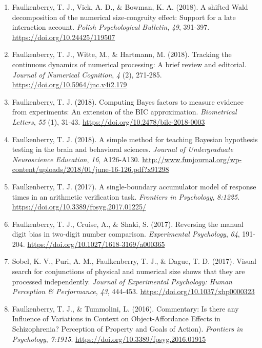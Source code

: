 \documentclass[article,10pt]{article}
\begin{document}
\begin{enumerate}
\item Faulkenberry, T. J., Vick, A. D., \& Bowman, K. A. (2018). A shifted Wald decomposition of the numerical size-congruity effect: Support for a late interaction account. \emph{Polish Psychological Bulletin}, \emph{49}, 391-397. \url{https://doi.org/}\href{http://dx.doi.org/10.24425/119507}{10.24425/119507}
\item Faulkenberry, T. J., Witte, M., \& Hartmann, M. (2018). Tracking the continuous dynamics of numerical processing: A brief review and editorial. \emph{Journal of Numerical Cognition}, \emph{4} (2), 271-285. \url{https://doi.org/}\href{http://dx.doi.org/10.5964/jnc.v4i2.179}{10.5964/jnc.v4i2.179}
\item Faulkenberry, T. J. (2018). Computing Bayes factors to measure evidence from experiments: An extension of the BIC approximation. \emph{Biometrical Letters}, \emph{55} (1), 31-43. \url{https://doi.org/}\href{https://doi.org/10.2478/bile-2018-0003}{10.2478/bile-2018-0003}
\item Faulkenberry, T. J. (2018). A simple method for teaching Bayesian hypothesis testing in the brain and behavioral sciences. \emph{Journal of Undergraduate Neuroscience Education}, \emph{16}, A126-A130. \url{http://www.funjournal.org/wp-content/uploads/2018/01/june-16-126.pdf?x91298}
\item Faulkenberry, T. J. (2017). A single-boundary accumulator model of response times in an arithmetic verification task. \emph{Frontiers in Psychology}, \emph{8:1225}. \url{https://doi.org/}\href{http://dx.doi.org/10.3389/fpsyg.2017.01225}{10.3389/fpsyg.2017.01225/}
\item Faulkenberry, T. J., Cruise, A., \& Shaki, S. (2017). Reversing the manual digit bias in two-digit number comparison. \emph{Experimental Psychology}, \emph{64}, 191-204. \url{https://doi.org/}\href{http://dx.doi.org/10.1027/1618-3169/a000365}{10.1027/1618-3169/a000365}
\item Sobel, K. V., Puri, A. M., Faulkenberry, T. J., \& Dague, T. D. (2017). Visual search for conjunctions of physical and numerical size shows that they are processed independently. \emph{Journal of Experimental Psychology: Human Perception \& Performance}, \emph{43}, 444-453. \url{https://doi.org/}\href{http://dx.doi.org/10.1037/xhp0000323}{10.1037/xhp0000323}
\item Faulkenberry, T. J., \& Tummolini, L. (2016). Commentary: Is there any Influence of Variations in Context on Object-Affordance Effects in Schizophrenia? Perception of Property and Goals of Action). \emph{Frontiers in Psychology}, \emph{7:1915}. \url{https://doi.org/}\href{http://dx.doi.org/10.3389/fpsyg.2016.01915}{10.3389/fpsyg.2016.01915}

\end{enumerate}
\end{document}
